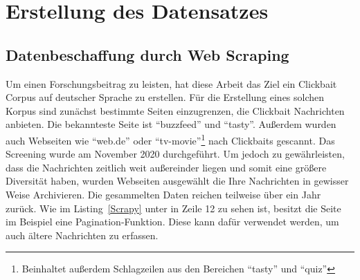 \chapter{Erstellung des Datensatzes}
\section{Datenbeschaffung durch Web Scraping}

Um einen Forschungsbeitrag zu leisten, hat diese Arbeit das Ziel ein Clickbait Corpus auf deutscher Sprache zu erstellen. Für die Erstellung eines solchen Korpus sind zunächst bestimmte Seiten einzugrenzen, die Clickbait Nachrichten anbieten. Die bekannteste Seite ist \enquote{buzzfeed} und \enquote{tasty}. Außerdem wurden auch Webseiten wie \enquote{web.de} oder \enquote{tv-movie}\footnote{Beinhaltet außerdem Schlagzeilen aus den Bereichen \enquote{tasty} und \enquote{quiz}} nach Clickbaits gescannt. Das Screening wurde am November 2020 durchgeführt. Um jedoch zu gewährleisten, dass die Nachrichten zeitlich weit außereinder liegen und somit eine größere Diversität haben, wurden Webseiten ausgewählt die Ihre Nachrichten in gewisser Weise Archivieren. Die gesammelten Daten reichen teilweise über ein Jahr zurück. Wie im Listing~\ref{Scrapy} unter in Zeile 12 zu sehen ist, besitzt die Seite im Beispiel eine Pagination-Funktion. Diese kann dafür verwendet werden, um auch ältere Nachrichten zu erfassen.

